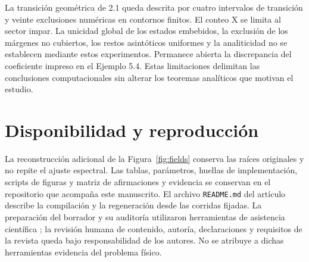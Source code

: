 \documentclass[11pt]{article}
\begin{document}
La transición geométrica de 2.1 queda descrita por cuatro intervalos de transición y veinte exclusiones numéricas en contornos finitos. El conteo X se limita al sector impar. La unicidad global de los estados embebidos, la exclusión de los márgenes no cubiertos, los restos asintóticos uniformes y la analiticidad no se establecen mediante estos experimentos. Permanece abierta la discrepancia del coeficiente impreso en el Ejemplo 5.4. Estas limitaciones delimitan las conclusiones computacionales sin alterar los teoremas analíticos que motivan el estudio.

\section*{Disponibilidad y reproducción}
La reconstrucción adicional de la Figura~\ref{fig:fields} conserva las raíces originales y no repite el ajuste espectral. Las tablas, parámetros, huellas de implementación, scripts de figuras y matriz de afirmaciones y evidencia se conservan en el repositorio que acompaña este manuscrito. El archivo \texttt{README.md} del artículo describe la compilación y la regeneración desde las corridas fijadas. La preparación del borrador y su auditoría utilizaron herramientas de asistencia científica \cite{Kassis2026}; la revisión humana de contenido, autoría, declaraciones y requisitos de la revista queda bajo responsabilidad de los autores. No se atribuye a dichas herramientas evidencia del problema físico.



\end{document}
